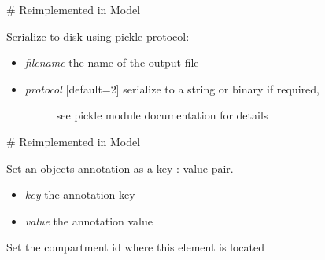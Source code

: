 \documentclass[a4paper,11pt,english]{sphinxmanual}
\begin{document}
\begin{fulllineitems}
\begin{fulllineitems}
\begin{itemize}
\begin{description}
\end{description}

\end{itemize}

\# Reimplemented in Model

\end{fulllineitems}


\begin{fulllineitems}
\label{modules_doc:cbmpy.CBModel.Fbase.serializeToDisk}
Serialize to disk using pickle protocol:
\begin{itemize}
\item {} 
\emph{filename} the name of the output file

\item {} \begin{description}
\item[{\emph{protocol} {[}default=2{]} serialize to a string or binary if required,}] \leavevmode
see pickle module documentation for details

\end{description}

\end{itemize}

\# Reimplemented in Model

\end{fulllineitems}


\begin{fulllineitems}
\label{modules_doc:cbmpy.CBModel.Fbase.setAnnotation}
Set an objects annotation as a key : value pair.
\begin{itemize}
\item {} 
\emph{key} the annotation key

\item {} 
\emph{value} the annotation value

\end{itemize}

\end{fulllineitems}


\begin{fulllineitems}
\label{modules_doc:cbmpy.CBModel.Fbase.setCompartmentId}
Set the compartment id where this element is located


\end{fulllineitems}
\end{fulllineitems}
\end{document}
